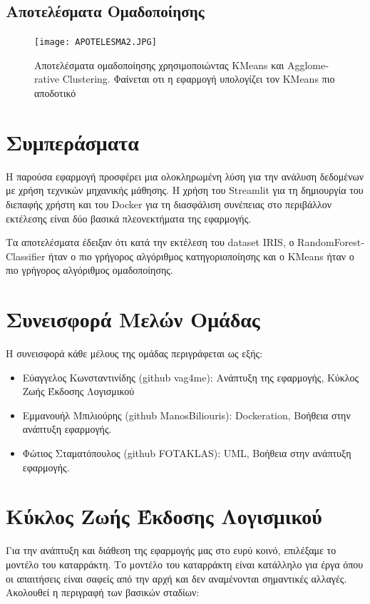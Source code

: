 \documentclass[a4paper,12pt]{article}
\begin{document}
\subsection{Αποτελέσματα Ομαδοποίησης}
\begin{figure}[h!]
\centering
\texttt{[image: APOTELESMA2.JPG]}
\caption{Αποτελέσματα ομαδοποίησης χρησιμοποιώντας \textlatin{KMeans} και \textlatin{Agglomerative Clustering}. Φαίνεται οτι η εφαρμογή υπολογίζει τον \textlatin{KMeans} πιο αποδοτικό}
\end{figure}

\section{Συμπεράσματα}
\label{sec:conclusion}
Η παρούσα εφαρμογή προσφέρει μια ολοκληρωμένη λύση για την ανάλυση δεδομένων με χρήση τεχνικών μηχανικής μάθησης. Η χρήση του \textlatin{Streamlit} για τη δημιουργία του διεπαφής χρήστη και του \textlatin{Docker} για τη διασφάλιση συνέπειας στο περιβάλλον εκτέλεσης είναι δύο βασικά πλεονεκτήματα της εφαρμογής.

Τα αποτελέσματα έδειξαν ότι κατά την εκτέλεση του dataset \textlatin{IRIS}, ο \textlatin{RandomForestClassifier} ήταν ο πιο γρήγορος αλγόριθμος κατηγοριοποίησης και ο \textlatin{KMeans} ήταν ο πιο γρήγορος αλγόριθμος ομαδοποίησης.

\section{Συνεισφορά Μελών Ομάδας}
\label{sec:contribution}
Η συνεισφορά κάθε μέλους της ομάδας περιγράφεται ως εξής:
\begin{itemize}
    \item Εύαγγελος Κωνσταντινίδης \textlatin{(github vag4me)}: Ανάπτυξη της εφαρμογής, Κύκλος Ζωής Έκδοσης Λογισμικού
    \item Εμμανουήλ Μπιλιούρης \textlatin{(github ManosBiliouris)}: Dockeration, Βοήθεια στην ανάπτυξη εφαρμογής.
    \item Φώτιος Σταματόπουλος \textlatin{(github FOTAKLAS)}: UML, Βοήθεια στην ανάπτυξη εφαρμογής.
\end{itemize}

\section{Κύκλος Ζωής Έκδοσης Λογισμικού}
\label{sec:software_lifecycle}
Για την ανάπτυξη και διάθεση της εφαρμογής μας στο ευρύ κοινό, επιλέξαμε το μοντέλο του καταρράκτη. Το μοντέλο του καταρράκτη είναι κατάλληλο για έργα όπου οι απαιτήσεις είναι σαφείς από την αρχή και δεν αναμένονται σημαντικές αλλαγές. Ακολουθεί η περιγραφή των βασικών σταδίων:
\end{document}
